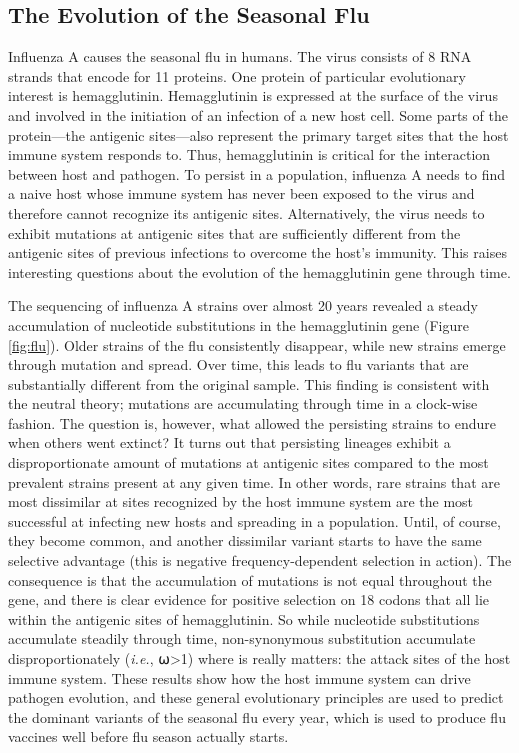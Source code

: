 \documentclass[
]{book}
\begin{document}
\hypertarget{the-evolution-of-the-seasonal-flu}{%
\subsection{The Evolution of the Seasonal Flu}\label{the-evolution-of-the-seasonal-flu}}

Influenza A causes the seasonal flu in humans. The virus consists of 8 RNA strands that encode for 11 proteins. One protein of particular evolutionary interest is hemagglutinin. Hemagglutinin is expressed at the surface of the virus and involved in the initiation of an infection of a new host cell. Some parts of the protein---the antigenic sites---also represent the primary target sites that the host immune system responds to. Thus, hemagglutinin is critical for the interaction between host and pathogen. To persist in a population, influenza A needs to find a naive host whose immune system has never been exposed to the virus and therefore cannot recognize its antigenic sites. Alternatively, the virus needs to exhibit mutations at antigenic sites that are sufficiently different from the antigenic sites of previous infections to overcome the host's immunity. This raises interesting questions about the evolution of the hemagglutinin gene through time.

The sequencing of influenza A strains over almost 20 years revealed a steady accumulation of nucleotide substitutions in the hemagglutinin gene (Figure \ref{fig:flu}). Older strains of the flu consistently disappear, while new strains emerge through mutation and spread. Over time, this leads to flu variants that are substantially different from the original sample. This finding is consistent with the neutral theory; mutations are accumulating through time in a clock-wise fashion. The question is, however, what allowed the persisting strains to endure when others went extinct? It turns out that persisting lineages exhibit a disproportionate amount of mutations at antigenic sites compared to the most prevalent strains present at any given time. In other words, rare strains that are most dissimilar at sites recognized by the host immune system are the most successful at infecting new hosts and spreading in a population. Until, of course, they become common, and another dissimilar variant starts to have the same selective advantage (this is negative frequency-dependent selection in action). The consequence is that the accumulation of mutations is not equal throughout the gene, and there is clear evidence for positive selection on 18 codons that all lie within the antigenic sites of hemagglutinin. So while nucleotide substitutions accumulate steadily through time, non-synonymous substitution accumulate disproportionately (\emph{i.e.}, ⍵\textgreater1) where is really matters: the attack sites of the host immune system. These results show how the host immune system can drive pathogen evolution, and these general evolutionary principles are used to predict the dominant variants of the seasonal flu every year, which is used to produce flu vaccines well before flu season actually starts.
\end{document}
